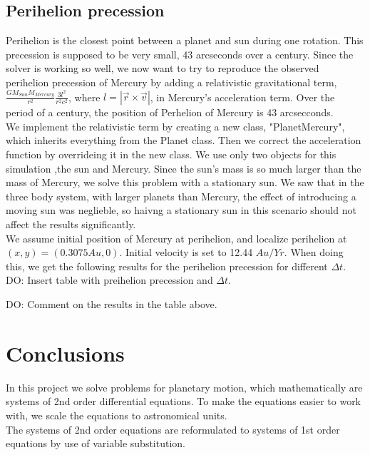 \documentclass{article}
\begin{document}
\subsection{Perihelion precession}
Perihelion is the closest point between a planet and sun during one rotation. This precession is supposed to be very small, 43 arcseconds over a century. Since the solver is working so well, we now want to try to reproduce the observed perihelion precession of Mercury by adding a relativistic gravitational term,$\frac{GM_{Sun} M_{Mercury}}{r^2} \frac{3l^2}{r^2c^2}$, where $l = |\vec{r} \times \vec{v}|$, in Mercury's acceleration term. Over the period of a century, the position of Perhelion of Mercury is 43 arcsecconds. \\

We implement the relativistic term by creating a new class, "PlanetMercury", which inherits everything from the Planet class. Then we correct the acceleration function by overrideing it in the new class. We use only two objects for this simulation ,the sun and Mercury. Since the sun's mass is so much larger than the mass of Mercury, we solve this problem with a stationary sun. We saw that in the three body system, with larger planets than Mercury, the effect of introducing a moving sun was neglieble, so haivng a stationary sun in this scenario should not affect the results significantly. \\

We assume initial position of Mercury at perihelion, and localize perihelion at $(x,y) = (0.3075 Au, 0)$. Initial velocity is set to 12.44 $Au/Yr$. When doing this, we get the following results for the perihelion precession for different $\Delta t$.\\

DO: Insert table with preihelion precession and $\Delta t$.

DO: Comment on the results in the table above. 


\section{Conclusions}
In this project we solve problems for planetary motion, which mathematically are systems of 2nd order differential equations. To make the equations easier to work with, we scale the equations to astronomical units.\\

The systems of 2nd order equations are reformulated to systems of 1st order equations by use of variable substitution. \\
\end{document}
